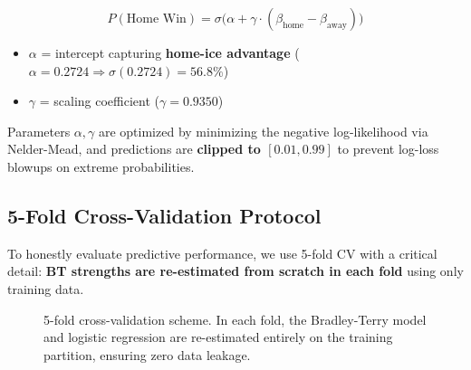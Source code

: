 \documentclass[11pt, a4paper]{article}
\begin{document}
\begin{equation}
\boxed{P(\text{Home Win}) = \sigma\!\big(\alpha + \gamma \cdot (\beta_{\text{home}} - \beta_{\text{away}})\big)}
\label{eq:logistic}
\end{equation}

\begin{itemize}[nosep]
    \item $\alpha$ = intercept capturing \textbf{home-ice advantage} ($\alpha = 0.2724 \Rightarrow \sigma(0.2724) = 56.8\%$)
    \item $\gamma$ = scaling coefficient ($\gamma = 0.9350$)
\end{itemize}

Parameters $\alpha, \gamma$ are optimized by minimizing the negative log-likelihood via Nelder-Mead, and predictions are \textbf{clipped to $[0.01, 0.99]$} to prevent log-loss blowups on extreme probabilities.

\subsection{5-Fold Cross-Validation Protocol}

To honestly evaluate predictive performance, we use 5-fold CV with a critical detail: \textbf{BT strengths are re-estimated from scratch in each fold} using only training data.

\begin{figure}[H]
\centering
{}
\caption{5-fold cross-validation scheme. In each fold, the Bradley-Terry model and logistic regression are re-estimated entirely on the training partition, ensuring zero data leakage.}
\label{fig:cv}
\end{figure}
\end{document}

